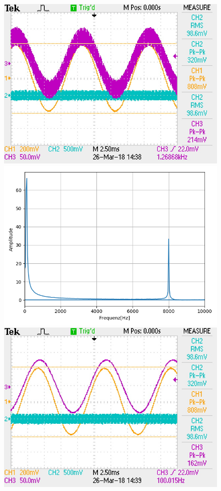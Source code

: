 \documentclass[12pt,a4paper]{article}
\begin{document}
\begin{figure}
\centering
\includegraphics[scale=0.9]{Bilder/Vorversuch3/F0003TEK.JPG}
\includegraphics[scale=0.5]{Bilder/Vorversuch3/Vor3_3.png}
\includegraphics[scale=0.9]{Bilder/Vorversuch3/F0004TEK.JPG}

\end{figure}
\end{document}
